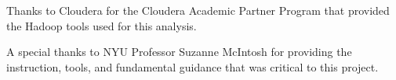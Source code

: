 \documentclass[conference,compsoc]{IEEEtran}
\begin{document}
Thanks to Cloudera for the Cloudera Academic Partner Program that provided the Hadoop tools used for this analysis.

A special thanks to NYU Professor Suzanne McIntosh for providing the instruction, tools, and fundamental guidance that was critical to this project.





%
%
%
\end{document}
